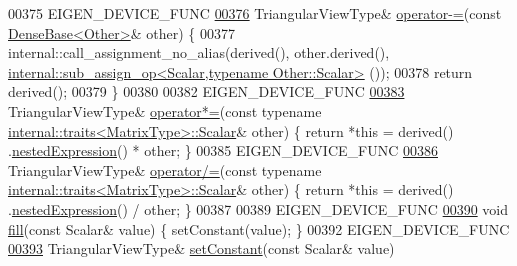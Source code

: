 \begin{DoxyCode}
00375     EIGEN\_DEVICE\_FUNC
\hyperlink{group___core___module_a9cc4a65490e86eb0cc0d7f764782eeb6}{00376}     TriangularViewType&  \hyperlink{group___core___module_a9cc4a65490e86eb0cc0d7f764782eeb6}{operator-=}(\textcolor{keyword}{const} \hyperlink{group___core___module_class_eigen_1_1_dense_base}{DenseBase<Other>}& other) \{
00377       internal::call\_assignment\_no\_alias(derived(), other.derived(), 
      \hyperlink{struct_eigen_1_1internal_1_1sub__assign__op}{internal::sub\_assign\_op<Scalar,typename Other::Scalar>}
      ());
00378       \textcolor{keywordflow}{return} derived();
00379     \}
00380     
00382     EIGEN\_DEVICE\_FUNC
\hyperlink{group___core___module_a70ea969ab731d87a0e73e2884ab8fbc4}{00383}     TriangularViewType&  \hyperlink{group___core___module_a70ea969ab731d87a0e73e2884ab8fbc4}{operator*=}(\textcolor{keyword}{const} \textcolor{keyword}{typename} 
      \hyperlink{struct_eigen_1_1internal_1_1traits}{internal::traits<MatrixType>::Scalar}& other) \{ \textcolor{keywordflow}{return} *\textcolor{keyword}{this} = derived()
      .\hyperlink{group___core___module_a83b7cdd9d9ea543a3c893fc2e74d8fbb}{nestedExpression}() * other; \}
00385     EIGEN\_DEVICE\_FUNC
\hyperlink{group___core___module_a3bcca994aae11aeef15acb734f9a1a3f}{00386}     TriangularViewType&  \hyperlink{group___core___module_a3bcca994aae11aeef15acb734f9a1a3f}{operator/=}(\textcolor{keyword}{const} \textcolor{keyword}{typename} 
      \hyperlink{struct_eigen_1_1internal_1_1traits}{internal::traits<MatrixType>::Scalar}& other) \{ \textcolor{keywordflow}{return} *\textcolor{keyword}{this} = derived()
      .\hyperlink{group___core___module_a83b7cdd9d9ea543a3c893fc2e74d8fbb}{nestedExpression}() / other; \}
00387 
00389     EIGEN\_DEVICE\_FUNC
\hyperlink{group___core___module_ad4093c8ecb74b7eb0567d1161bcc9964}{00390}     \textcolor{keywordtype}{void} \hyperlink{group___core___module_ad4093c8ecb74b7eb0567d1161bcc9964}{fill}(\textcolor{keyword}{const} Scalar& value) \{ setConstant(value); \}
00392     EIGEN\_DEVICE\_FUNC
\hyperlink{group___core___module_aae1460a593106b7e22fad56ce2c3c957}{00393}     TriangularViewType& \hyperlink{group___core___module_aae1460a593106b7e22fad56ce2c3c957}{setConstant}(\textcolor{keyword}{const} Scalar& value)

\end{DoxyCode}
